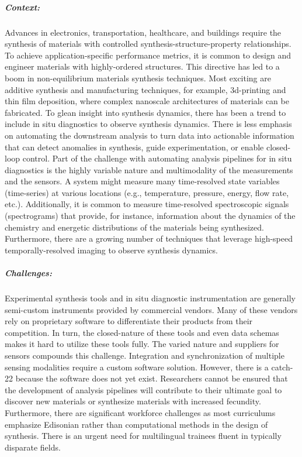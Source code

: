 \subparagraph*{Context:} Advances in electronics, transportation, healthcare, and buildings require the synthesis of materials with controlled synthesis-structure-property relationships. 
To achieve application-specific performance metrics, it is common to design and engineer materials with highly-ordered structures. 
This directive has led to a boom in non-equilibrium materials synthesis techniques. 
Most exciting are additive synthesis and manufacturing techniques, for example, 3d-printing\cite{Wang2020-tv,Parekh2016-vj,Visser2015-hy,Ligon2017-dg,Zarek2016-dw} and thin film deposition\cite{Chrisey1994-gw,Richter1990-ml,Yoshino2000-oo,Kelly2000-xk,Marvel2013-cd,George2010-pb,Park2001-so}, where complex nanoscale architectures of materials can be fabricated. 
To glean insight into synthesis dynamics, there has been a trend to include in situ diagnostics to observe synthesis dynamics\cite{Ojeda-G-P2017-la,Egelhoff1989-pr,Thomas1999-ij,Langereis2007-dj}.
There is less emphasis  on automating the downstream analysis to turn data into actionable information that can detect anomalies in synthesis, guide experimentation, or enable closed-loop control. Part of the challenge with automating analysis pipelines for in situ diagnostics is the highly variable nature and multimodality of the measurements and the sensors. 
A system might measure many time-resolved state variables (time-series) at various locations (e.g., temperature, pressure, energy, flow rate, etc.)\cite{Hansen1999-an}. 
Additionally, it is common to measure time-resolved spectroscopic signals (spectrograms) that provide, for instance, information about the dynamics of the chemistry and energetic distributions of the materials being synthesized\cite{Cooks2018-jm,Termopoli2019-gb,Dauchot1995-cu,Aubriet2002-ln}. 
Furthermore, there are a growing number of techniques that leverage high-speed temporally-resolved imaging to observe synthesis dynamics\cite{Trigub2017-xw,Ojeda-G-P2018-cv}.

        
\subparagraph*{Challenges:} Experimental synthesis tools and in situ diagnostic instrumentation are generally semi-custom instruments provided by commercial vendors. 
Many of these vendors rely on proprietary software to differentiate their products from their competition. In turn, the closed-nature of these tools and even data schemas makes it hard to utilize these tools fully. The varied nature and suppliers for sensors compounds this challenge. Integration and synchronization of multiple sensing modalities require a custom software solution. 
However, there is a catch-22 because the software does not yet exist. 
Researchers cannot be ensured that the development of analysis pipelines will contribute to their ultimate goal to discover new materials or synthesize materials with increased fecundity. Furthermore, there are significant workforce challenges as most curriculums emphasize Edisonian rather than computational methods in the design of synthesis. There is an urgent need for multilingual trainees fluent in typically disparate fields. 

